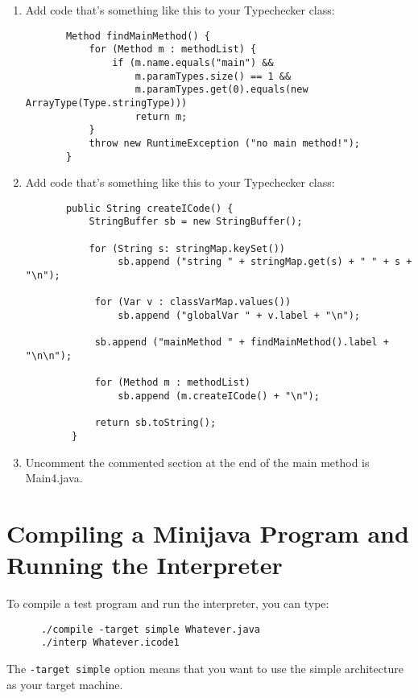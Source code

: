 \documentclass[11pt]{article}
\begin{document}
\begin{enumerate}
\begin{verbatim}
           return "method " + label + " " 
               + b.idString() + " "
               + frame.getFrameInfo() + "\n" 
               + new ICode(b, frame)
               + "endMethod\n\n";
       }
\end{verbatim}
\item Add code that's something like this to your Typechecker class:
\begin{verbatim}
       Method findMainMethod() {
           for (Method m : methodList) {
               if (m.name.equals("main") &&
                   m.paramTypes.size() == 1 &&
                   m.paramTypes.get(0).equals(new ArrayType(Type.stringType)))
                   return m;
           }
           throw new RuntimeException ("no main method!");
       }
\end{verbatim}

\item Add code that's something like this to your Typechecker class:
\begin{verbatim}
       public String createICode() {
           StringBuffer sb = new StringBuffer();
        
           for (String s: stringMap.keySet())
                sb.append ("string " + stringMap.get(s) + " " + s + "\n");

            for (Var v : classVarMap.values())
                sb.append ("globalVar " + v.label + "\n");

            sb.append ("mainMethod " + findMainMethod().label + "\n\n");

            for (Method m : methodList)
                sb.append (m.createICode() + "\n");

            return sb.toString();
        }
\end{verbatim}
\item Uncomment the commented section at the end of the main method is Main4.java.

\end{enumerate}
 
\section{Compiling a Minijava Program and Running the Interpreter}
To compile a test program and run the interpreter, you can type:
\begin{verbatim}
      ./compile -target simple Whatever.java
      ./interp Whatever.icode1
\end{verbatim}
The \verb'-target simple' option means that you want to use the simple architecture as your target machine.
\end{document}

